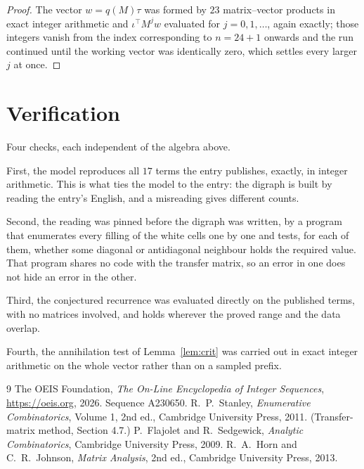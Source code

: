 \documentclass[11pt,a4paper]{article}
\theoremstyle{plain}
\theoremstyle{definition}
\begin{document}
\begin{proof}
The vector $w=q(M)\tau$ was formed by $23$ matrix--vector products in exact integer
arithmetic and $\iota^{\!\top}M^{j}w$ evaluated for $j=0,1,\dots$, again exactly; those
integers vanish from the index corresponding to $n=24+1$ onwards and the run continued
until the working vector was identically zero, which settles every larger $j$ at once.
\end{proof}

\section{Verification}

Four checks, each independent of the algebra above.

First, the model reproduces all $17$ terms the entry publishes, exactly, in integer
arithmetic. This is what ties the model to the entry: the digraph is built by reading the
entry's English, and a misreading gives different counts.

Second, the reading was pinned before the digraph was written, by a program that enumerates
every filling of the white cells one by one and tests, for each of them, whether some
diagonal or antidiagonal neighbour holds the required value. That program shares no code with the transfer matrix, so an error in one does not
hide an error in the other.

Third, the conjectured recurrence was evaluated directly on the published terms, with no
matrices involved, and holds wherever the proved range and the data overlap.

Fourth, the annihilation test of Lemma~\ref{lem:crit} was carried out in exact integer
arithmetic on the whole vector rather than on a sampled prefix.

\begin{thebibliography}{9}
 The OEIS Foundation, \emph{The On-Line Encyclopedia of Integer
Sequences}, \url{https://oeis.org}, 2026. Sequence A230650.
 R.~P.~Stanley, \emph{Enumerative Combinatorics}, Volume 1, 2nd ed.,
Cambridge University Press, 2011. (Transfer-matrix method, Section 4.7.)
 P.~Flajolet and R.~Sedgewick, \emph{Analytic Combinatorics}, Cambridge
University Press, 2009.
 R.~A.~Horn and C.~R.~Johnson, \emph{Matrix Analysis}, 2nd ed., Cambridge
University Press, 2013.
\end{thebibliography}
\end{document}
